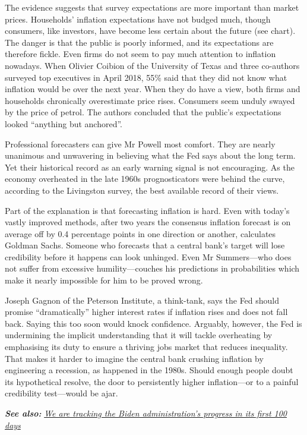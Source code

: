 \documentclass{article}
\begin{document}
The evidence suggests that survey expectations are more important than market prices. Households' inflation expectations have not budged much, though consumers, like investors, have become less certain about the future (see chart). The danger is that the public is poorly informed, and its expectations are therefore fickle. Even firms do not seem to pay much attention to inflation nowadays. When Olivier Coibion of the University of Texas and three co-authors surveyed top executives in April 2018, 55\% said that they did not know what inflation would be over the next year. When they do have a view, both firms and households chronically overestimate price rises. Consumers seem unduly swayed by the price of petrol. The authors concluded that the public's expectations looked ``anything but anchored''. 

Professional forecasters can give Mr Powell most comfort. They are nearly unanimous and unwavering in believing what the Fed says about the long term. Yet their historical record as an early warning signal is not encouraging. As the economy overheated in the late 1960s prognosticators were behind the curve, according to the Livingston survey, the best available record of their views. 

Part of the explanation is that forecasting inflation is hard. Even with today's vastly improved methods, after two years the consensus inflation forecast is on average off by 0.4 percentage points in one direction or another, calculates Goldman Sachs. Someone who forecasts that a central bank's target will lose credibility before it happens can look unhinged. Even Mr Summers---who does not suffer from excessive humility---couches his predictions in probabilities which make it nearly impossible for him to be proved wrong. 

Joseph Gagnon of the Peterson Institute, a think-tank, says the Fed should promise ``dramatically'' higher interest rates if inflation rises and does not fall back. Saying this too soon would knock confidence. Arguably, however, the Fed is undermining the implicit understanding that it will tackle overheating by emphasising its duty to ensure a thriving jobs market that reduces inequality. That makes it harder to imagine the central bank crushing inflation by engineering a recession, as happened in the 1980s. Should enough people doubt its hypothetical resolve, the door to persistently higher inflation---or to a painful credibility test---would be ajar. {} 

\textbf{\emph{See also:}} \href{https://www.economist.com/tracking-joe-biden}{\emph{We are tracking the Biden administration's progress in its first 100 days}} 
\end{document}
